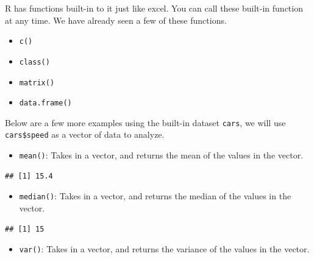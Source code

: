 \documentclass[
]{book}
\newenvironment{Shaded}{\begin{snugshade}}{\end{snugshade}}
\newcommand{\KeywordTok}[1]{\textcolor[rgb]{0.13,0.29,0.53}{\textbf{#1}}}
\newcommand{\NormalTok}[1]{#1}
\newcommand{\OperatorTok}[1]{\textcolor[rgb]{0.81,0.36,0.00}{\textbf{#1}}}
\providecommand{\tightlist}{%
  \setlength{\itemsep}{0pt}\setlength{\parskip}{0pt}}
\begin{document}
R has functions built-in to it just like excel. You can call these built-in function at any time. We have already seen a few of these functions.

\begin{itemize}
\tightlist
\item
  \texttt{c()}
\item
  \texttt{class()}
\item
  \texttt{matrix()}
\item
  \texttt{data.frame()}
\end{itemize}

Below are a few more examples using the built-in dataset \texttt{cars}, we will use \texttt{cars\$speed} as a vector of data to analyze.

\begin{itemize}
\tightlist
\item
  \texttt{mean()}: Takes in a vector, and returns the mean of the values in the vector.
\end{itemize}

\begin{Shaded}
\end{Shaded}

\begin{verbatim}
## [1] 15.4
\end{verbatim}

\begin{itemize}
\tightlist
\item
  \texttt{median()}: Takes in a vector, and returns the median of the values in the vector.
\end{itemize}

\begin{Shaded}
\end{Shaded}

\begin{verbatim}
## [1] 15
\end{verbatim}

\begin{itemize}
\tightlist
\item
  \texttt{var()}: Takes in a vector, and returns the variance of the values in the vector.
\end{itemize}
\end{document}
